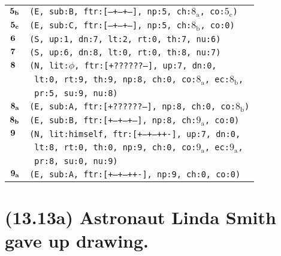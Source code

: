 \documentclass{article}
\begin{document}
\begin{minipage}{\textwidth}
{\begin{tabular}{|r|l|}
    ${\textbf{\textrm{5}}_{\textbf{\textrm{b}}}}$ & \texttt{\texttt{(E,~sub:B,~ftr:[---+--+--],~np:5,~ch:${\textrm{8}_{\textrm{a}}}$,~co:${\textrm{5}_{\textrm{c}}}$)}} \\
    ${\textbf{\textrm{5}}_{\textbf{\textrm{c}}}}$ & \texttt{\texttt{(E,~sub:C,~ftr:[---+--+--],~np:5,~ch:${\textrm{8}_{\textrm{b}}}$,~co:0)}} \\
    ${\textbf{\textrm{6}}_{\phantom{z}}}$ & \texttt{\texttt{(S,~up:1,~dn:7,~lt:2,~rt:0,~th:7,~nu:6)}} \\
    ${\textbf{\textrm{7}}_{\phantom{z}}}$ & \texttt{\texttt{(S,~up:6,~dn:8,~lt:0,~rt:0,~th:8,~nu:7)}} \\
    ${\textbf{\textrm{8}}_{\phantom{z}}}$ & \texttt{\texttt{(N,~lit:$\phi$,~ftr:[+??????--],~up:7,~dn:0,}} \\
    & \texttt{\texttt{~lt:0,~rt:9,~th:9,~np:8,~ch:0,~co:${\textrm{8}_{\textrm{a}}}$,~ec:${\textrm{8}_{\textrm{b}}}$,}} \\
    & \texttt{\texttt{~pr:5,~su:9,~nu:8)}} \\
    ${\textbf{\textrm{8}}_{\textbf{\textrm{a}}}}$ & \texttt{\texttt{(E,~sub:A,~ftr:[+??????--],~np:8,~ch:0,~co:${\textrm{8}_{\textrm{b}}}$)}} \\
    ${\textbf{\textrm{8}}_{\textbf{\textrm{b}}}}$ & \texttt{\texttt{(E,~sub:B,~ftr:[+--+--+--],~np:8,~ch:${\textrm{9}_{\textrm{a}}}$,~co:0)}} \\
    ${\textbf{\textrm{9}}_{\phantom{z}}}$ & \texttt{\texttt{(N,~lit:himself,~ftr:[+--+--++-],~up:7,~dn:0,}} \\
    & \texttt{\texttt{~lt:8,~rt:0,~th:0,~np:9,~ch:0,~co:${\textrm{9}_{\textrm{a}}}$,~ec:${\textrm{9}_{\textrm{a}}}$,}} \\
    & \texttt{\texttt{~pr:8,~su:0,~nu:9)}} \\
    ${\textbf{\textrm{9}}_{\textbf{\textrm{a}}}}$ & \texttt{\texttt{(E,~sub:A,~ftr:[+--+--++-],~np:9,~ch:0,~co:0)}} \\
    \hline
  \end{tabular}
  }
\end{minipage}
\bigbreak

\clearpage

%
%

\section*{(13.13a) Astronaut Linda Smith gave up drawing.}
\end{document}
